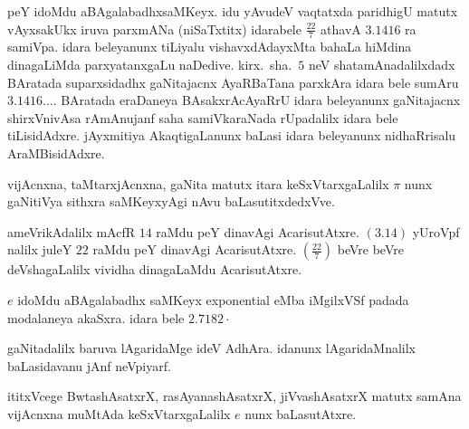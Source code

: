 peY idoMdu aBAgalabadhxsaMKeyx. idu yAvudeV vaqtatxda paridhigU matutx vAyxsakUkx iruva parxmANa (niSaTxtitx) idarabele $\frac{22}{7}$ athavA $3.1416$ ra samiVpa. idara beleyanunx tiLiyalu vishavxdAdayxMta bahaLa hiMdina dinagaLiMda parxyatanxgaLu naDedive. kirx.~sha.\ $5$ neV shatamAnadalilxdadx BAratada suparxsidadhx gaNitajacnx AyaRBaTana parxkAra idara bele sumAru $3.1416\ldots$. BAratada eraDaneya BAsakxrAcAyaRrU idara beleyanunx gaNitajacnx shirxVnivAsa rAmAnujanf saha samiVkaraNada rUpadalilx idara bele tiLisidAdxre. jAyxmitiya AkaqtigaLanunx baLasi idara beleyanunx nidhaRrisalu AraMBisidAdxre. 

vijAcnxna, taMtarxjAcnxna, gaNita matutx itara keSxVtarxgaLalilx $\pi$ nunx gaNitiVya sithxra saMKeyx\-yAgi nAvu baLasutitxdedxVve. 

ameVrikAdalilx mAcfR $14$ raMdu peY dinavAgi AcarisutAtxre. $(3.14)$ yUroVpf nalilx juleY $22$ raMdu peY dinavAgi AcarisutAtxre. $(\frac{22}{7})$ beVre beVre deVshagaLalilx vividha dinagaLaMdu AcarisutAtxre.

$e$ idoMdu aBAgalabadhx saMKeyx {\rm exponential} eMba iMgilxVSf padada modala\-neya akaSxra. idara bele $2.7182\cdot$

gaNitadalilx baruva lAgaridaMge ideV AdhAra. idanunx lAgaridaMnalilx baLasidavanu jAnf neVpiyarf.

ititxVcege BwtashAsatxrX, rasAyanashAsatxrX, jiVvashAsatxrX matutx samAna vijAcnxna muMtAda keSxVtarxgaLalilx $e$ nunx baLasutAtxre.


